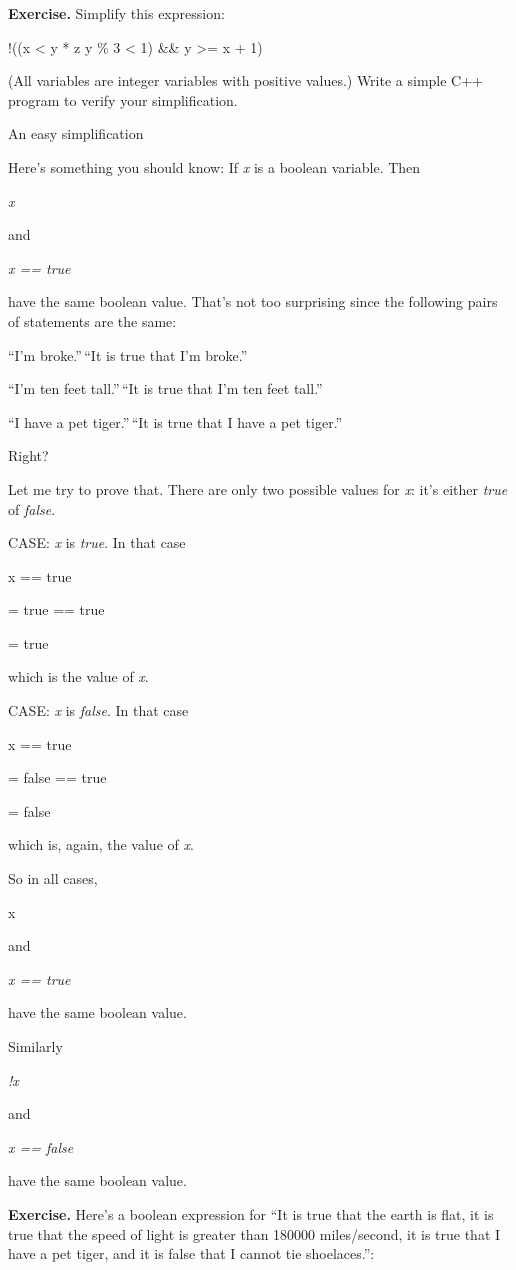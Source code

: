 \documentclass[
]{article}
\begin{document}
\textbf{Exercise.} Simplify this expression:

!((x \textless{} y * z \textbar\textbar{} y \% 3 \textless{} 1) \&\& y
\textgreater= x + 1)

(All variables are integer variables with positive values.) Write a
simple C++ program to verify your simplification.

An easy simplification

Here's something you should know: If \emph{x} is a boolean variable.
Then

\emph{x}

and

\emph{x == true}

have the same boolean value. That's not too surprising since the
following pairs of statements are the same:

``I'm broke.''\,``It is true that I'm broke.''

``I'm ten feet tall.''\,``It is true that I'm ten feet tall.''

``I have a pet tiger.''\,``It is true that I have a pet tiger.''

Right?

Let me try to prove that. There are only two possible values for
\emph{x}: it's either \emph{true} of \emph{false}.

CASE: \emph{x} is \emph{true}. In that case

x == true

= true == true

= true

which is the value of \emph{x}.

CASE: \emph{x} is \emph{false}. In that case

x == true

= false == true

= false

which is, again, the value of \emph{x}.

So in all cases,

x

and

\emph{x == true}

have the same boolean value.

Similarly

\emph{!x}

and

\emph{x == false}

have the same boolean value.

\textbf{Exercise.} Here's a boolean expression for ``It is true that the
earth is flat, it is true that the speed of light is greater than 180000
miles/second, it is true that I have a pet tiger, and it is false that I
cannot tie shoelaces.'':
\end{document}
